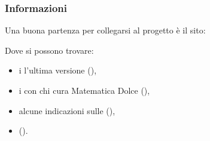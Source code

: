 \documentclass{beamer} %
\begin{document}
\begin{frame}\frametitle{Informazioni}

Una buona partenza per collegarsi al progetto è il sito:

\bigskip
\begin{center}
\href{https://www.matematicadolce.eu}
     {{\huge {}}}
\end{center}

\bigskip
Dove si possono trovare:
\begin{itemize}
\item i  l'ultima versione 
(),
\item i  con chi cura Matematica Dolce
(),
\item alcune indicazioni sulle 
(),
\item {}
().
\end{itemize}

\spause
\begin{center}  \end{center}



\end{frame}
\end{document}
